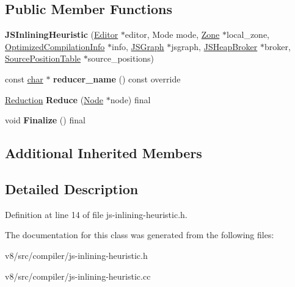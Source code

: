 \subsection*{Public Member Functions}
\begin{DoxyCompactItemize}
\item 
\mbox{\label{classv8_1_1internal_1_1compiler_1_1JSInliningHeuristic_adc56c56b8005a19497141087157b39f9}} 
{\bfseries J\+S\+Inlining\+Heuristic} (\mbox{\hyperlink{classv8_1_1internal_1_1compiler_1_1AdvancedReducer_1_1Editor}{Editor}} $\ast$editor, Mode mode, \mbox{\hyperlink{classv8_1_1internal_1_1Zone}{Zone}} $\ast$local\+\_\+zone, \mbox{\hyperlink{classv8_1_1internal_1_1OptimizedCompilationInfo}{Optimized\+Compilation\+Info}} $\ast$info, \mbox{\hyperlink{classv8_1_1internal_1_1compiler_1_1JSGraph}{J\+S\+Graph}} $\ast$jsgraph, \mbox{\hyperlink{classv8_1_1internal_1_1compiler_1_1JSHeapBroker}{J\+S\+Heap\+Broker}} $\ast$broker, \mbox{\hyperlink{classv8_1_1internal_1_1compiler_1_1SourcePositionTable}{Source\+Position\+Table}} $\ast$source\+\_\+positions)
\item 
\mbox{\label{classv8_1_1internal_1_1compiler_1_1JSInliningHeuristic_ab09bd5e0ac356cbf60879e0debba631b}} 
const \mbox{\hyperlink{classchar}{char}} $\ast$ {\bfseries reducer\+\_\+name} () const override
\item 
\mbox{\label{classv8_1_1internal_1_1compiler_1_1JSInliningHeuristic_a46c67cd61d9ab1b3123e0fecf458e936}} 
\mbox{\hyperlink{classv8_1_1internal_1_1compiler_1_1Reduction}{Reduction}} {\bfseries Reduce} (\mbox{\hyperlink{classv8_1_1internal_1_1compiler_1_1Node}{Node}} $\ast$node) final
\item 
\mbox{\label{classv8_1_1internal_1_1compiler_1_1JSInliningHeuristic_aa74c825a3782aa899312b7ea57d74e85}} 
void {\bfseries Finalize} () final
\end{DoxyCompactItemize}
\subsection*{Additional Inherited Members}


\subsection{Detailed Description}


Definition at line 14 of file js-\/inlining-\/heuristic.\+h.



The documentation for this class was generated from the following files\+:\begin{DoxyCompactItemize}
\item 
v8/src/compiler/js-\/inlining-\/heuristic.\+h\item 
v8/src/compiler/js-\/inlining-\/heuristic.\+cc\end{DoxyCompactItemize}
